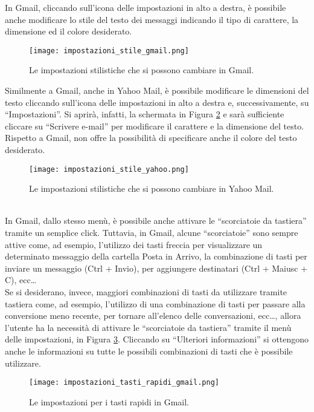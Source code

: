 		In Gmail, cliccando sull'icona delle impostazioni in alto a destra, è possibile anche modificare lo stile del testo dei messaggi indicando il tipo di carattere, la dimensione ed il colore desiderato.
		\begin{figure}[h!]
			\begin{center}
				\texttt{[image: impostazioni\_stile\_gmail.png]}
			\end{center}
			\caption[Impostazioni dello stile in Gmail]{Le impostazioni stilistiche che si possono cambiare in Gmail.}
			\label{fig:impostazioni_stile_gmail}
		\end{figure}
		
		Similmente a Gmail, anche in Yahoo Mail, è possibile modificare le dimensioni del testo cliccando sull'icona delle impostazioni in alto a destra e, successivamente, su ``Impostazioni''. Si aprirà, infatti, la schermata in Figura \ref{fig:impostazioni_stile_yahoo} e sarà sufficiente cliccare su ``Scrivere e-mail'' per modificare il carattere e la dimensione del testo. Rispetto a Gmail, non offre la possibilità di specificare anche il colore del testo desiderato.
		\begin{figure}[h!]
			\begin{center}
				\texttt{[image: impostazioni\_stile\_yahoo.png]}
			\end{center}
			\caption[Impostazioni dello stile in Yahoo Mail]{Le impostazioni stilistiche che si possono cambiare in Yahoo Mail.}
			\label{fig:impostazioni_stile_yahoo}
		\end{figure}
		\\
		
		In Gmail, dallo stesso menù, è possibile anche attivare le ``scorciatoie da tastiera'' tramite un semplice click. Tuttavia, in Gmail, alcune ``scorciatoie'' sono sempre attive come, ad esempio, l'utilizzo dei tasti freccia per visualizzare un determinato messaggio della cartella Posta in Arrivo, la combinazione di tasti per inviare un messaggio (Ctrl + Invio), per aggiungere destinatari (Ctrl + Maiusc + C), ecc\dots\\
		Se si desiderano, invece, maggiori combinazioni di tasti da utilizzare tramite tastiera come, ad esempio, l'utilizzo di una combinazione di tasti per passare alla conversione meno recente, per tornare all'elenco delle conversazioni, ecc\dots, allora l'utente ha la necessità di attivare le ``scorciatoie da tastiera'' tramite il menù delle impostazioni, in Figura \ref{fig:impostazioni_tasti_rapidi_gmail}. Cliccando su ``Ulteriori informazioni'' si ottengono anche le informazioni su tutte le possibili combinazioni di tasti che è possibile utilizzare.
		\begin{figure}[h!]
			\begin{center}
				\texttt{[image: impostazioni\_tasti\_rapidi\_gmail.png]}
			\end{center}
			\caption[Impostazioni dei tasti rapidi in Gmail]{Le impostazioni per i tasti rapidi in Gmail.}
			\label{fig:impostazioni_tasti_rapidi_gmail}
		\end{figure}
		
